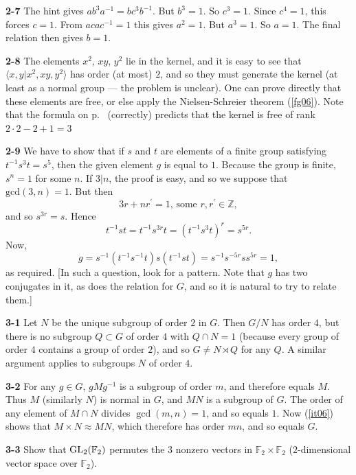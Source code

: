 \documentclass[a4paper,11pt,final,openany]{memoir}%
\theoremstyle{nonumberplain}
\begin{document}
\bigskip\noindent\textbf{2-7}
The hint gives $ab^{3}a^{-1}=bc^{3}b^{-1}$. But $b^{3}=1$. So $c^{3}=1$. Since
$c^{4}=1$, this forces $c=1$. From $acac^{-1}=1$ this gives $a^{2}=1$. But
$a^{3}=1$. So $a=1$. The final relation then gives $b=1 $.

\bigskip\noindent\textbf{2-8}
The elements $x^{2}$, $xy$, $y^{2}$ lie in the kernel, and it is easy to see
that $\langle x,y|x^{2},xy,y^{2}\rangle$ has order (at most) $2$, and so they
must generate the kernel (at least as a normal group --- the problem is
unclear). One can prove directly that these elements are free, or else apply
the Nielsen-Schreier theorem (\ref{fg06}). Note that the formula on
p.~\pageref{fg06} (correctly) predicts that the kernel is free of rank
$2\cdot2-2+1=3$

\bigskip\noindent\textbf{2-9}
We have to show that if $s$ and $t$ are elements of a finite group satisfying
$t^{-1}s^{3}t=s^{5}$, then the given element $g$ is equal to $1$. Because the
group is finite, $s^{n}=1$ for some $n$. If $3|n$, the proof is easy, and so
we suppose that $\mathrm{gcd}(3,n)=1$. But then
\[
3r+nr^{\prime}=1\text{, some }r,r^{\prime}\in\mathbb{Z}{},
\]
and so $s^{3r}=s$. Hence
\[
t^{-1}st=t^{-1}s^{3r}t=(t^{-1}s^{3}t)^{r}=s^{5r}.
\]
Now,\hfill%
\[
g=s^{-1}(t^{-1}s^{-1}t)s(t^{-1}st)=s^{-1}s^{-5r}ss^{5r}=1,
\]
as required. [In such a question, look for a pattern. Note that $g$ has two
conjugates in it, as does the relation for $G$, and so it is natural to try to
relate them.]

\bigskip\noindent\textbf{3-1}
Let $N$ be the unique subgroup of order $2$ in $G$. Then $G/N$ has order $4$,
but there is no subgroup $Q\subset G$ of order $4$ with $Q\cap N=1$ (because
every group of order $4$ contains a group of order $2$), and so $G\neq
N\rtimes Q$ for any $Q$. A similar argument applies to subgroups $N$ of order
$4$.

\bigskip\noindent\textbf{3-2}
For any $g\in G$, $gMg^{-1}$ is a subgroup of order $m$, and therefore equals
$M$. Thus $M$ (similarly $N$) is normal in $G $, and $MN$ is a subgroup of
$G$. The order of any element of $M\cap N$ divides $\gcd(m,n)=1$, and so
equals $1$. Now (\ref{it06}) shows that $M\times N\approx MN$, which therefore
has order $mn$, and so equals $G$.

\bigskip\noindent\textbf{3-3}
Show that $\operatorname{GL}_{2}(\mathbb{F}_{2})$ permutes the $3$ nonzero vectors in
$\mathbb{F}_{2}\times\mathbb{F}{}_{2}$ ($2$-dimensional vector space over
$\mathbb{F}{}_{2}$).
\end{document}
